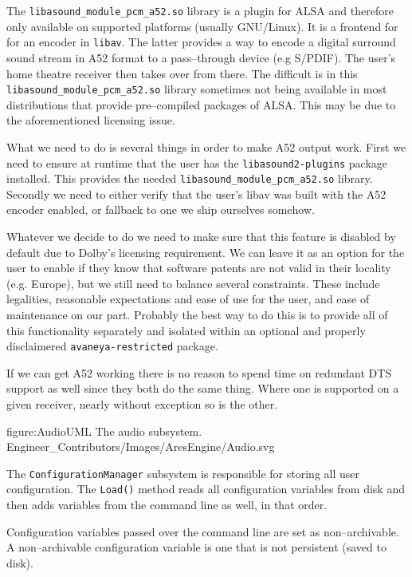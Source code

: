 The {\tt libasound_module_pcm_a52.so} library is a plugin for ALSA and therefore only available on supported platforms (usually GNU/Linux). It is a frontend for for an encoder in {\tt libav}. The latter provides a way to encode a digital surround sound stream in A52 format to a pass--through device (e.g S/PDIF). The user's home theatre receiver then takes over from there. The difficult is in this {\tt libasound_module_pcm_a52.so} library sometimes not being available in most distributions that provide pre--compiled packages of ALSA. This may be due to the aforementioned licensing issue. 

What we need to do is several things in order to make A52 output work. First we need to ensure at runtime that the user has the {\tt libasound2-plugins} package installed. This provides the needed {\tt libasound_module_pcm_a52.so} library. Secondly we need to either verify that the user's libav was built with the A52 encoder enabled, or fallback to one we ship ourselves somehow.

Whatever we decide to do we need to make sure that this feature is disabled by default due to Dolby's licensing requirement. We can leave it as an option for the user to enable if they know that software patents are not valid in their locality (e.g. Europe), but we still need to balance several constraints. These include legalities, reasonable expectations and ease of use for the user, and ease of maintenance on our part. Probably the best way to do this is to provide all of this functionality separately and isolated within an optional and properly disclaimered {\tt avaneya-restricted} package.

If we can get A52 working there is no reason to spend time on redundant DTS support as well since they both do the same thing. Where one is supported on a given receiver, nearly without exception so is the other.


\FullPageDiagram
    {figure:AudioUML}
    {The audio subsystem.}
    {Engineer_Contributors/Images/AresEngine/Audio.svg}

\page
{}
The {\tt ConfigurationManager} subsystem is responsible for storing all user configuration. The {\tt Load()} method reads all configuration variables from disk and then adds variables from the command line as well, in that order. 

Configuration variables passed over the command line are set as non--archivable. A non--archivable configuration variable is one that is not persistent (saved to disk).

